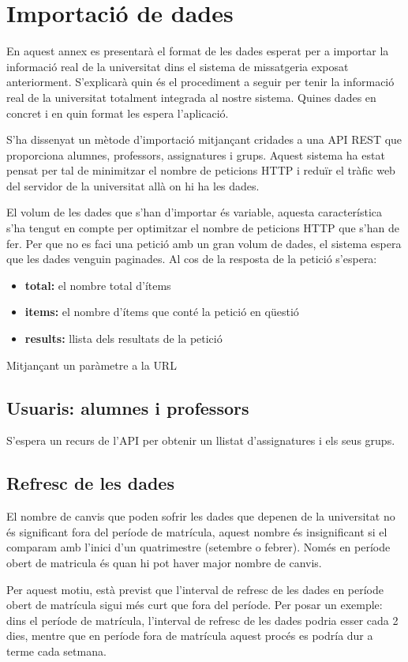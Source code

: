 \chapter{Importació de dades}\label{importacio}


En aquest annex es presentarà el format de les dades esperat per a importar la informació real de la universitat dins el sistema de missatgeria exposat anteriorment. S'explicarà quin és el procediment a seguir per tenir la informació real de la universitat totalment integrada al nostre sistema. Quines dades en concret i en quin format les espera l'aplicació.

S'ha dissenyat un mètode d'importació mitjançant cridades a una \ac{API} \ac{REST} que proporciona alumnes, professors, assignatures i grups. Aquest sistema ha estat pensat per tal de minimitzar el nombre de peticions HTTP i reduïr el tràfic web del servidor de la universitat allà on hi ha les dades.

El volum de les dades que s'han d'importar és variable, aquesta característica s'ha tengut en compte per optimitzar el nombre de peticions \ac{HTTP} que s'han de fer. Per que no es faci una petició amb un gran volum de dades, el sistema espera que les dades venguin paginades. Al cos de la resposta de la petició s'espera:
\begin{itemize}
 	\item \textbf{total:} el nombre total d'ítems
 	\item \textbf{items:} el nombre d'ítems que conté la petició en qüestió
 	\item \textbf{results:} llista dels resultats de la petició
 \end{itemize}
  
 Mitjançant un paràmetre a la \ac{URL}
\section{Usuaris: alumnes i professors}
 S'espera un recurs de l'\ac{API} per obtenir un llistat d'assignatures i els seus grups.

\section{Refresc de les dades}
El nombre de canvis que poden sofrir les dades que depenen de la universitat no és significant fora del període de matrícula, aquest nombre és insignificant si el comparam amb l'inici d'un quatrimestre (setembre o febrer). Només en període obert de matricula és quan hi pot haver major nombre de canvis. 

Per aquest motiu, està previst que l'interval de refresc de les dades en període obert de matrícula sigui  més curt que fora del període. Per posar un exemple: dins el període de matrícula, l'interval de refresc de les dades podria esser cada 2 dies, mentre que en període fora de matrícula aquest procés es podría dur a terme cada setmana.
